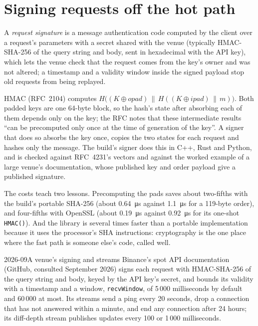 \section{Signing requests off the hot path}

\begin{definition}\label{def:ll:websocket-rest-tls-and-json-at-speed:signature}
A \emph{request signature} is a message authentication code computed by the client over a request's parameters with a secret
shared with the venue (typically HMAC-SHA-256 of the query string and body, sent in hexadecimal with the API key), which lets
the venue check that the request comes from the key's owner and was not altered; a timestamp and a validity window inside the
signed payload stop old requests from being replayed.
\end{definition}

HMAC (RFC~2104) computes $H\big((K \oplus \mathit{opad}) \,\|\, H((K \oplus \mathit{ipad}) \,\|\, m)\big)$. Both padded keys
are one 64-byte block, so the hash's state after absorbing each of them depends only on the key; the RFC notes that these
intermediate results ``can be precomputed only once at the time of generation of the key''. A signer that does so absorbs the
key once, copies the two states for each request and hashes only the message. The build's signer does this in C++, Rust and
Python, and is checked against RFC~4231's vectors and against the worked example of a large venue's documentation, whose
published key and order payload give a published signature.

\label{lst:ll:websocket-rest-tls-and-json-at-speed:hmac}

The costs teach two lessons. Precomputing the pads saves about two-fifths with the build's portable SHA-256 (about
\qty{0.64}{\micro\second} against \qty{1.1}{\micro\second} for a 119-byte order), and four-fifths with OpenSSL (about
\qty{0.19}{\micro\second} against \qty{0.92}{\micro\second} for its one-shot \texttt{HMAC()}). And the library is several times
faster than a portable implementation because it uses the processor's SHA instructions: cryptography is the one place where
the fast path is someone else's code, called well.

\begin{dated}{2026-09}{A venue's signing and streams}\label{dat:ll:websocket-rest-tls-and-json-at-speed:venue}
Binance's spot API documentation (GitHub, consulted September 2026) signs each request with HMAC-SHA-256 of the query string
and body, keyed by the API key's secret, and bounds its validity with a timestamp and a window, \texttt{recvWindow}, of 5\,000
milliseconds by default and 60\,000 at most. Its  streams send a ping every 20 seconds, drop a connection that has not
answered within a minute, and end any connection after 24 hours; its diff-depth stream publishes updates every 100 or 1\,000
milliseconds.
\end{dated}

